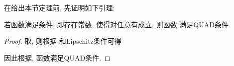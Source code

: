         在给出本节定理前, 先证明如下引理:
         \begin{lem}\label{lem:7}
            若函数满足条件, 即存在常数, 使得对任意有成立, 则函数 满足QUAD条件.
        \end{lem}
        \begin{proof}
            取, 则根据 和Lipschitz条件可得
            \begin{comment}
              &\quad(x-y)^\top G[f(x)-f(y)-\Delta(x-y)]\\
              &=(x-y)\top[f(x)-f(y)]-(1+\frac{l^2}{2})(x-y)^\top(x-y)\\
              &\leq\frac{1}{2}(x-y)^\top(x-y)+\frac{1}{2}(f(x)-f(y))^\top(f(x)-f(y))-(1+\frac{l^2}{2})(x-y)^\top(x-y)\\
              &\leq-\frac{1}{2}(1+l^2)(x-y)^\top(x-y)+\frac{l^2}{2}\| x-y\|^2\\
              &=-\frac{1}{2}(x-y)^\top G(x-y).
            \end{comment}
            因此根据, 函数满足QUAD条件.
        \end{proof}


